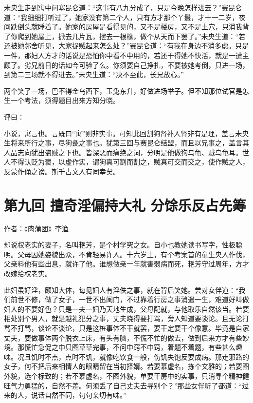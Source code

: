 \documentclass[a4paper,12pt,UTF8,twoside]{ctexbook}
\begin{document}
未央生走到寓中问塞昆仑道：“这事有八九分成了，只是今晚怎样进去？”赛昆仑道：“我细细打听过了，她家没有第二个人，只有方才那个丫鬟，才十一二岁，夜间跌倒头就睡着了。她家的房屋是看得见的，又不是楼房，又不是土穴，只消我背了你爬到她屋上，掀去几片瓦，摆去一根椽，做个从天而下罢了。”未央生道：“若还被她邻舍听见，大家捉贼起来怎么处？”赛昆仑道：“有我在身边不消多虑。只是一件，那妇人方才的话说是恐怕你中看不中用的，若还干得她不快活，就是一遭主顾了。劣兄前日的话如今可验了么。你须要自己挣扎，不要被她考倒，只进一场，到第二三场就不得进去。”未央生道：“决不至此，长兄放心。”

两个笑了一场，巴不得金乌西下，玉兔东升，好做进场举子。但不知那位试官是怎生一个考法，须得题目出来方知分晓。

评曰：

小说，寓言也。言既曰“寓”则非实事。可知此回割狗肾补人肾非有是理，盖言未央生将来所行之事，尽狗彘之事也。犹第三回与赛昆仑结盟，而且以兄事之，盖言其人品志向犹出盗贼之下也。皆深恶而痛绝之词，分明是他做狗乌龟、贼乌龟耳。世人不得认贬为褒，以虚作实，谓狗真可割而割之，贼真可交而交之，使作贼之人，反蒙作俑之谤。斯千古文人有同幸矣。

\chapter{第九回 擅奇淫偏持大礼 分馀乐反占先筹}

作者：《肉蒲团》李渔

却说权老实的妻子，名叫艳芳，是个村学究之女。自小也教她读书写字，性极聪明。父母因她姿貌出众，不肯轻易许人。十六岁上，有个考案首的童生央人作伐，父亲料他有些出息，就许了他。谁想做亲一年就害弱病而死，艳芳守过周年，方才改嫁给权老实。

此妇虽好淫，颇知大体，每见妇人有淫佚之事，就在背后笑她。尝对女伴道：“我们前世不修，做了女子，一世不出闺门，不过靠着行房之事消遣一生，难道好叫做妇人的不要好色？只是一夫一妇乃天地生成，父母配就，与他取乐自然该当。若要相处别个男人，就是越礼犯分之事，丈夫晓得要打骂，旁人知道要谈论。且无论打骂不打骂，谈论不谈论，只是这桩事体不干就罢，要干定要干个像意。毕竟是自家丈夫，要做事体两个脱衣上床，有头有脑，不慌不忙的做去，做到后来方才有些妙境。那慌忙急促之中只图草草完事，不问中窍不中窍，着题不着题，有些甚么趣味。况且饥时不点，点时不饥，就像吃饮食一般，伤饥失饱反要成病。那走邪路的女子，何不把后来相情人的眼睛留在当初择婿。若要慕虚名，拣个文雅的；若要图外貌，选个标致的；若不慕虚名，不图外貌，单要干房中的实事，只消寻个精神健旺气力勇猛的，自然不差。何须丢了自己丈夫去寻别个？”那些女伴听了都道：“过来的人，说话自然不同，句句亲切有味。”
\end{document}
